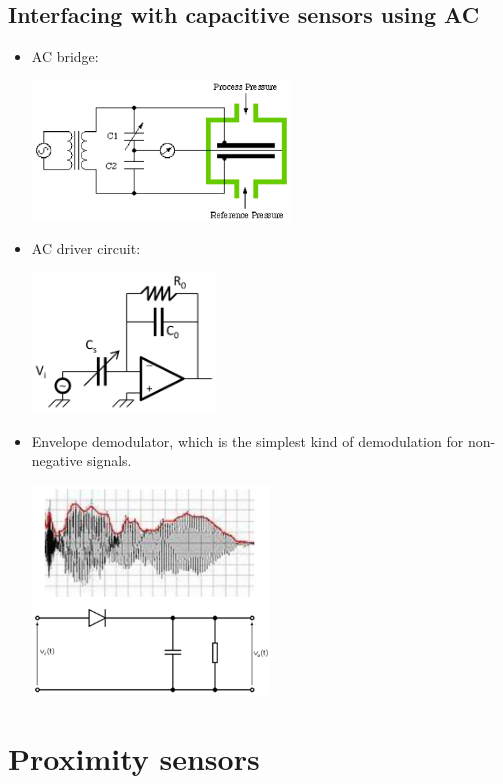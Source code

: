 \documentclass[11pt]{article}
\begin{document}
\subsection{Interfacing with capacitive sensors using AC}
\label{sec:org85c2883}
\begin{itemize}
\item AC bridge:
\begin{center}
\includegraphics[height=10em]{./images/ac-bridge-circuit-diagram.png}
\end{center}
\item AC driver circuit:
\begin{center}
\includegraphics[height=10em]{./images/ac-driver-circuit-diagram.png}
\end{center}
\item Envelope demodulator, which is the simplest kind of demodulation for non-negative signals.
\begin{center}
\includegraphics[height=15em]{./images/envelope-demodulator.png}
\end{center}
\end{itemize}
\section{Proximity sensors}
\label{sec:orgb298442}
\end{document}
